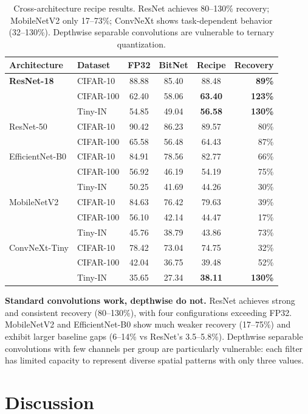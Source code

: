 \documentclass[10pt]{article}
\begin{document}
\begin{table}[ht]
\centering
\caption{Cross-architecture recipe results. ResNet achieves 80--130\% recovery; MobileNetV2 only 17--73\%; ConvNeXt shows task-dependent behavior (32--130\%). Depthwise separable convolutions are vulnerable to ternary quantization.}
\label{tab:arch_short}
\small
\begin{tabular}{llcccr}
\toprule
Architecture & Dataset & FP32 & BitNet & Recipe & Recovery \\
\midrule
\textbf{ResNet-18} & CIFAR-10 & 88.88 & 85.40 & 88.48 & \textbf{89\%} \\
 & CIFAR-100 & 62.40 & 58.06 & \textbf{63.40} & \textbf{123\%} \\
 & Tiny-IN & 54.85 & 49.04 & \textbf{56.58} & \textbf{130\%} \\
\midrule
ResNet-50 & CIFAR-10 & 90.42 & 86.23 & 89.57 & 80\% \\
 & CIFAR-100 & 65.58 & 56.48 & 64.43 & 87\% \\
\midrule
EfficientNet-B0 & CIFAR-10 & 84.91 & 78.56 & 82.77 & 66\% \\
 & CIFAR-100 & 56.92 & 46.19 & 54.19 & 75\% \\
 & Tiny-IN & 50.25 & 41.69 & 44.26 & 30\% \\
\midrule
MobileNetV2 & CIFAR-10 & 84.63 & 76.42 & 79.63 & 39\% \\
 & CIFAR-100 & 56.10 & 42.14 & 44.47 & 17\% \\
 & Tiny-IN & 45.76 & 38.79 & 43.86 & 73\% \\
\midrule
ConvNeXt-Tiny & CIFAR-10 & 78.42 & 73.04 & 74.75 & 32\% \\
 & CIFAR-100 & 42.04 & 36.75 & 39.48 & 52\% \\
 & Tiny-IN & 35.65 & 27.34 & \textbf{38.11} & \textbf{130\%} \\
\bottomrule
\end{tabular}
\end{table}

\textbf{Standard convolutions work, depthwise do not.} ResNet achieves strong and consistent recovery (80--130\%), with four configurations exceeding FP32. MobileNetV2 and EfficientNet-B0 show much weaker recovery (17--75\%) and exhibit larger baseline gaps (6--14\% vs ResNet's 3.5--5.8\%). Depthwise separable convolutions with few channels per group are particularly vulnerable: each filter has limited capacity to represent diverse spatial patterns with only three values.

\section{Discussion}
\end{document}
